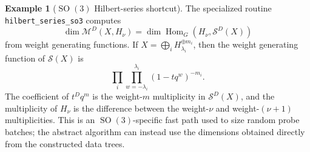 \documentclass[11pt]{article}
\newcommand{\scM}{\mathcal{M}}
\newcommand{\scS}{\mathcal{S}}
\newcommand{\HomG}[2]{\operatorname{Hom}_G\!\left(#1,#2\right)}
\newcommand{\SO}{\operatorname{SO}}
\theoremstyle{definition}
\newtheorem{example}[theorem]{Example}
\begin{document}
\begin{example}[$\SO(3)$ Hilbert-series shortcut]\label{ex:so3-hilbert-shortcut}
  The specialized routine \texttt{hilbert\_series\_so3} computes
  \[
    \dim \scM^D(X,H_\nu)
    =
    \dim \HomG{H_\nu}{\scS^D(X)}
  \]
  from weight generating functions.  If $X=\bigoplus_i H_{\lambda_i}^{\oplus m_i}$, then the weight generating function of $\scS(X)$ is
  \[
    \prod_i\prod_{w=-\lambda_i}^{\lambda_i}(1-tq^w)^{-m_i}.
  \]
  The coefficient of $t^Dq^m$ is the weight-$m$ multiplicity in $\scS^D(X)$, and the multiplicity of $H_\nu$ is the difference between the weight-$\nu$ and weight-$(\nu+1)$ multiplicities.  This is an $\SO(3)$-specific fast path used to size random probe batches; the abstract algorithm can instead use the dimensions obtained directly from the constructed data trees.
\end{example}
\end{document}
